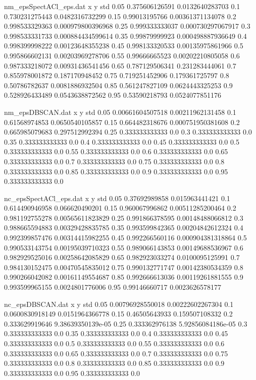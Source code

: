 \begin{filecontents}{nm_epsSpectACl_eps.dat}
x y std
0.05 0.375606126591 0.0132640283703
0.1 0.730231275443 0.0482316732299
0.15 0.99013195766 0.00361371134078
0.2 0.998533329363 0.000979800396968
0.25 0.999333333037 0.000730297067917
0.3 0.998533331733 0.000884434599614
0.35 0.99879999923 0.000498887936649
0.4 0.998399998222 0.00123648355238
0.45 0.998133320533 0.00135975861966
0.5 0.995866602131 0.00203969278706
0.55 0.99666665523 0.00202210805058
0.6 0.987333218072 0.00931436541456
0.65 0.787129506341 0.231283444061
0.7 0.855978001872 0.187170948452
0.75 0.719251452906 0.179361725797
0.8 0.50786782637 0.0081886932504
0.85 0.561247827109 0.0624443325253
0.9 0.528926433489 0.0543638872562
0.95 0.53590218793 0.0524077851176
\end{filecontents}
\begin{filecontents}{nm_epsDBSCAN.dat}
x y std
0.05 0.00661604507518 0.00211962131458
0.1 0.61568974853 0.0650540105857
0.15 0.664482318676 0.000751950381608
0.2 0.665985079683 0.297512992394
0.25 0.333333333333 0.0
0.3 0.333333333333 0.0
0.35 0.333333333333 0.0
0.4 0.333333333333 0.0
0.45 0.333333333333 0.0
0.5 0.333333333333 0.0
0.55 0.333333333333 0.0
0.6 0.333333333333 0.0
0.65 0.333333333333 0.0
0.7 0.333333333333 0.0
0.75 0.333333333333 0.0
0.8 0.333333333333 0.0
0.85 0.333333333333 0.0
0.9 0.333333333333 0.0
0.95 0.333333333333 0.0
\end{filecontents}
\begin{filecontents}{nc_epsSpectACl_eps.dat}
x y std
0.05 0.37692989858 0.015963441421
0.1 0.614490946958 0.066620490201
0.15 0.960067996862 0.00511285200464
0.2 0.981192755278 0.00565611823829
0.25 0.991866378595 0.00148488066812
0.3 0.988665594883 0.00329428835785
0.35 0.993599842365 0.00204842612324
0.4 0.992399857476 0.00314415982255
0.45 0.992266560116 0.000904381318864
0.5 0.990533143754 0.00195039710323
0.55 0.989066143853 0.00149688536967
0.6 0.982929525016 0.00258642085829
0.65 0.982923033274 0.0100095125991
0.7 0.984130152475 0.00470545835012
0.75 0.990132771747 0.00142380534359
0.8 0.990266042082 0.00161149554687
0.85 0.992666613036 0.00119261881555
0.9 0.993599965155 0.0024801776006
0.95 0.99146660717 0.0023626578177
\end{filecontents}
\begin{filecontents}{nc_epsDBSCAN.dat}
x y std
0.05 0.00796928550018 0.00222602267304
0.1 0.0600830918149 0.0151964366778
0.15 0.46505643933 0.159507108332
0.2 0.333629919646 9.38639350139e-05
0.25 0.333362976138 5.92856084186e-05
0.3 0.333333333333 0.0
0.35 0.333333333333 0.0
0.4 0.333333333333 0.0
0.45 0.333333333333 0.0
0.5 0.333333333333 0.0
0.55 0.333333333333 0.0
0.6 0.333333333333 0.0
0.65 0.333333333333 0.0
0.7 0.333333333333 0.0
0.75 0.333333333333 0.0
0.8 0.333333333333 0.0
0.85 0.333333333333 0.0
0.9 0.333333333333 0.0
0.95 0.333333333333 0.0
\end{filecontents}
